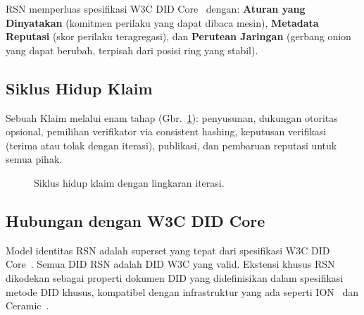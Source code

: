 \documentclass[11pt,a4paper,twocolumn]{article}
\begin{document}
RSN memperluas spesifikasi W3C DID Core~\cite{did2022} dengan: \textbf{Aturan yang Dinyatakan} (komitmen perilaku yang dapat dibaca mesin), \textbf{Metadata Reputasi} (skor perilaku teragregasi), dan \textbf{Perutean Jaringan} (gerbang onion yang dapat berubah, terpisah dari posisi ring yang stabil).

\subsection{Siklus Hidup Klaim}

Sebuah Klaim melalui enam tahap (Gbr.~\ref{fig:lifecycle}): penyusunan, dukungan otoritas opsional, pemilihan verifikator via consistent hashing, keputusan verifikasi (terima atau tolak dengan iterasi), publikasi, dan pembaruan reputasi untuk semua pihak.

\begin{figure}[ht]
\centering
{}
\caption{Siklus hidup klaim dengan lingkaran iterasi.}
\label{fig:lifecycle}
\end{figure}

\subsection{Hubungan dengan W3C DID Core}

Model identitas RSN adalah superset yang tepat dari spesifikasi W3C DID Core~\cite{did2022}. Semua DID RSN adalah DID W3C yang valid. Ekstensi khusus RSN dikodekan sebagai properti dokumen DID yang didefinisikan dalam spesifikasi metode DID khusus, kompatibel dengan infrastruktur yang ada seperti ION~\cite{buchner2021} dan Ceramic~\cite{ceramic2023}.
\end{document}
